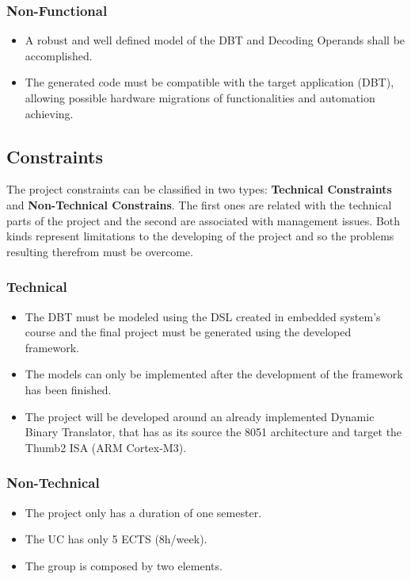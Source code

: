 \documentclass[12pt]{article}
\begin{document}
{\subsubsection{Non-Functional}
\begin{itemize}
\item A robust and well defined model of the DBT and Decoding Operands shall be accomplished.
\item The generated code must be compatible with the target application (DBT), allowing possible hardware migrations of functionalities and automation achieving.
\end{itemize}


\subsection{Constraints}
The project constraints can be classified in two types: \textbf{Technical Constraints} and \textbf{Non-Technical Constrains}. The first ones are related with the technical parts of the project and the second are associated with management issues. Both kinds represent limitations to the developing of the project and so the problems resulting therefrom must be overcome.

\subsubsection{Technical}
\begin{itemize}
\item The DBT must be modeled using the DSL created in embedded system's course and the final project must be generated using the developed framework. 
\item The models can only be implemented after the development of the framework has been finished.
\item The project will be developed around an already implemented Dynamic Binary Translator, that has as its source the 8051 architecture and target the Thumb2 ISA (ARM Cortex-M3).
\end{itemize}

\subsubsection{Non-Technical}
\begin{itemize}
\item The project only has a duration of one semester.
\item The UC has only 5 ECTS (8h/week).
\item The group is composed by two elements.
\end{itemize}

}
\end{document}
